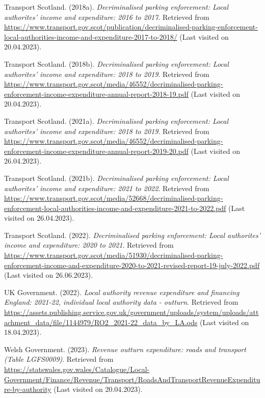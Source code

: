 \documentclass[
  12pt,
]{article}
\newlength{\cslhangindent}
\newlength{\cslentryspacingunit} %
\newenvironment{CSLReferences}[2] %
 {%
  \setlength{\parindent}{0pt}
  \ifodd #1
  \let\oldpar\par
  \def\par{\hangindent=\cslhangindent\oldpar}
  \fi
  \setlength{\parskip}{#2\cslentryspacingunit}
 }%
 {}
\begin{document}
\begin{CSLReferences}{1}{0}
\leavevmode{}%
Transport Scotland. (2018a). \emph{Decriminalised parking enforcement: Local authorites' income and expenditure: 2016 to 2017}. Retrieved from \url{https://www.transport.gov.scot/publication/decriminalised-parking-enforcement-local-authorities-income-and-expenditure-2017-to-2018/} (Last visited on 20.04.2023).

\leavevmode{}%
Transport Scotland. (2018b). \emph{Decriminalised parking enforcement: Local authorites' income and expenditure: 2018 to 2019}. Retrieved from \url{https://www.transport.gov.scot/media/46552/decriminalised-parking-enforcement-income-expenditure-annual-report-2018-19.pdf} (Last visited on 20.04.2023).

\leavevmode{}%
Transport Scotland. (2021a). \emph{Decriminalised parking enforcement: Local authorites' income and expenditure: 2018 to 2019}. Retrieved from \url{https://www.transport.gov.scot/media/46552/decriminalised-parking-enforcement-income-expenditure-annual-report-2019-20.pdf} (Last visited on 26.04.2023).

\leavevmode{}%
Transport Scotland. (2021b). \emph{Decriminalised parking enforcement: Local authorites' income and expenditure: 2021 to 2022}. Retrieved from \url{https://www.transport.gov.scot/media/52668/decriminalised-parking-enforcement-local-authorities-income-and-expenditure-2021-to-2022.pdf} (Last visited on 26.04.2023).

\leavevmode{}%
Transport Scotland. (2022). \emph{Decriminalised parking enforcement: Local authorites' income and expenditure: 2020 to 2021}. Retrieved from \url{https://www.transport.gov.scot/media/51930/decriminalised-parking-enforcement-income-and-expenditure-2020-to-2021-revised-report-19-july-2022.pdf} (Last visited on 26.06.2023).

\leavevmode{}%
UK Government. (2022). \emph{{Local authority revenue expenditure and financing England: 2021-22, individual local authority data - outturn}}. Retrieved from \url{https://assets.publishing.service.gov.uk/government/uploads/system/uploads/attachment_data/file/1144979/RO2_2021-22_data_by_LA.ods} (Last visited on 18.04.2023).

\leavevmode{}%
Welsh Government. (2023). \emph{{Revenue outturn expenditure: roads and transport (Table LGFS0009)}}. Retrieved from \url{https://statswales.gov.wales/Catalogue/Local-Government/Finance/Revenue/Transport/RoadsAndTransportRevenueExpenditure-by-authority} (Last visited on 20.04.2023).

\end{CSLReferences}
\end{document}
